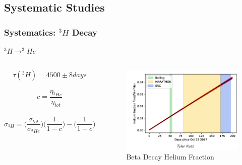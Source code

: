 \documentclass[12pt]{beamer}
\begin{document}
\subsection[Systematic Studies]{Systematic Studies}
\begin{frame}
\frametitle{Systematics: $^3H $ Decay}
	\begin{block}{$^3H \rightarrow ^3He$}
		\begin{columns}
			\begin{equation*}
			 	\tau(^3H) = 4500 \pm 8 days
			 \end{equation*}		 	
			 \\
			 \begin{equation*}
			 	c = \frac{\eta_{^3He}} {\eta_{tot}}
			 \end{equation*}
			 \\
 			 \begin{equation*}
				 \sigma_{^3H} = \big(\frac{\sigma_{tot}}{\sigma_{^3He}}\big) \big(\frac{1}{1-c}\big) -  \big(\frac{1}{1-c}\big)  
			 \end{equation*}
		 	\begin{figure}
		 		\caption*{Beta Decay Helium Fraction}
			 	\includegraphics[width=6cm]{../images/beta_decay.png}
			 \end{figure}
		\end{columns}
	\end{block}
\end{frame}
\end{document}
